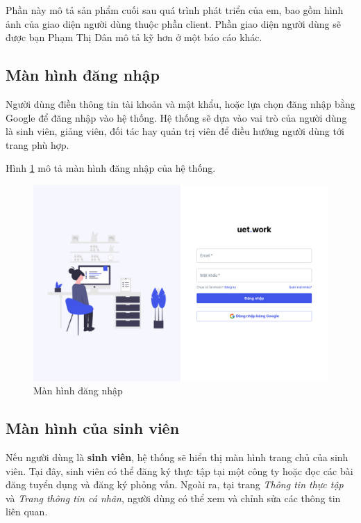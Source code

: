 \documentclass[./../main.tex]{subfiles}
\begin{document}
Phần này mô tả sản phẩm cuối sau quá trình phát triển của em, bao gồm
hình ảnh của giao diện người dùng thuộc phần client. Phần giao diện
người dùng sẽ được bạn Phạm Thị Dân mô tả kỹ hơn ở một báo cáo khác.

\subsection{Màn hình đăng nhập}

Người dùng điền thông tin tài khoản và mật khẩu, hoặc lựa chọn đăng nhập
bằng Google để đăng nhập vào hệ thống. Hệ thống sẽ dựa vào vai trò của
người dùng là sinh viên, giảng viên, đối tác hay quản trị viên để điều
hướng người dùng tới trang phù hợp.

Hình \ref{fig:login_page} mô tả màn hình đăng nhập của hệ thống.

\begin{figure}[]
	\includegraphics[width=\linewidth]{./images/image5.png}
	\caption{Màn hình đăng nhập}
	\label{fig:login_page}
\end{figure}

\subsection{Màn hình của sinh viên}

Nếu người dùng là \textbf{sinh viên}, hệ thống sẽ hiển thị màn hình
trang chủ của sinh viên. Tại đây, sinh viên có thể đăng ký thực tập tại
một công ty hoặc đọc các bài đăng tuyển dụng và đăng ký phỏng vấn. Ngoài
ra, tại trang \emph{Thông tin thực tập} và \emph{Trang thông tin cá
nhân}, người dùng có thể xem và chỉnh sửa các thông tin liên quan.
\end{document}
